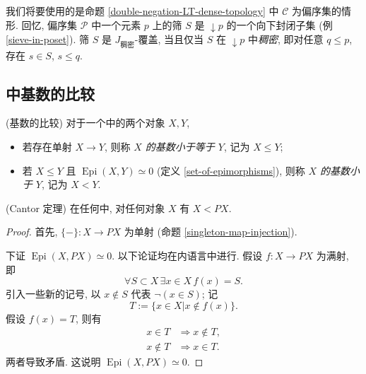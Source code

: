 我们将要使用的是命题 \ref{double-negation-LT-dense-topology} 中 $\mathcal C$ 为偏序集的情形. 回忆, 偏序集 $\mathcal P$ 中一个元素 $p$ 上的筛 $S$ 是 $\downarrow p$ 的一个向下封闭子集 (例 \ref{sieve-in-poset}).
筛 $S$ 是 $J_{\text{稠密}}$-覆盖, 当且仅当 $S$ 在 $\downarrow p$ 中\emph{稠密}, 即对任意 $q\leq p$, 存在 $s\in S$, $s\leq q$.

\subsection{\topos{}中基数的比较}

\begin{definition}
	{(基数的比较)}
	对于一个\topos{}中的两个对象 $X,Y$,
	\begin{itemize}
		\item 若存在单射 $X\to Y$, 则称 \emph{$X$ 的基数小于等于 $Y$}, 记为 $X\leq Y$;
		\item 若 $X\leq Y$ 且 $\operatorname{Epi}(X,Y)\simeq 0$ (定义 \ref{set-of-epimorphisms}), 则称 \emph{$X$ 的基数小于 $Y$}, 记为 $X<Y$.
	\end{itemize}
\end{definition}


\begin{prop}
	{(Cantor 定理)}
	在任何\topos{}中, 对任何对象 $X$ 有 $X<PX$.
\end{prop}
\begin{proof}
	首先, $\{-\}\colon X\to PX$ 为单射 (命题 \ref{singleton-map-injection}).
	
	下证 $\operatorname{Epi}(X,PX)\simeq 0$. 以下论证均在内语言中进行. 假设 $f\colon X\to PX$ 为满射, 即 $$\forall S\subset X \,\exists x\in X\,f(x)=S.$$
	引入一些新的记号, 以 $x\notin S$ 代表 $\neg(x\in S)$; 记 $$T:=\{x\in X| x\notin f(x)\}.$$
	假设 $f(x)=T$, 则有
	\begin{align*}
		x\in T & \Rightarrow x\notin T,\\
		x\notin T &\Rightarrow x\in T.
	\end{align*}
	两者导致矛盾\footnotemark{}.
	这说明 $\operatorname{Epi}(X,PX)\simeq 0$.
\end{proof}

